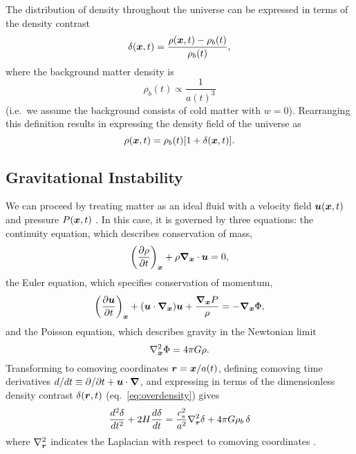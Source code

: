 The distribution of density throughout the universe can be expressed
in terms of the density contrast
\begin{equation}
  \label{eq:overdensity}
  \delta(\boldsymbol{x}, t) = \frac{\rho(\boldsymbol{x}, t) - \rho_b(t)}{\rho_b(t)},
\end{equation}
where the background matter density is
\begin{equation}
  \rho_b(t) \propto \frac{1}{a(t)^3}
\end{equation}
(i.e.~we assume the background consists of cold matter with $w=0$).
Rearranging this definition results in expressing the density field of the
universe as
\begin{equation}
  \rho(\boldsymbol{x}, t) = \rho_b(t)[1 + \delta(\boldsymbol{x}, t)].
\end{equation}

\subsection{Gravitational Instability}
We can proceed by treating matter as an ideal fluid with a
velocity field $\boldsymbol{u}(\boldsymbol{x}, t)$ and pressure $P(\boldsymbol{x}, t)$
\citep{longair2008galaxy}.
In this case, it is governed by three equations: the
continuity equation, which describes conservation of mass,
\begin{equation}
  \label{eq:continuity}
  \left(\frac{\partial\rho}{\partial t}\right)_{\boldsymbol{x}}
  + \rho\boldsymbol{\nabla}_{\boldsymbol{x}}\cdot\boldsymbol{u} = 0,
\end{equation}
the Euler equation, which specifies conservation of momentum,
\begin{equation}
  \label{eq:euler}
  \left(\frac{\partial\boldsymbol{u}}{\partial t}\right)_{\boldsymbol{x}}
  + (\boldsymbol{u}\cdot\boldsymbol{\nabla}_{\boldsymbol{x}})\boldsymbol{u}
  + \frac{\boldsymbol{\nabla}_{\boldsymbol{x}}P}{\rho}
  = -\boldsymbol{\nabla}_{\boldsymbol{x}}\Phi,
\end{equation}
and the Poisson equation, which describes gravity in the Newtonian limit
\begin{equation}
  \label{eq:poisson}
  \nabla_{\boldsymbol{x}}^2\Phi = 4\pi G\rho.
\end{equation}
Transforming to comoving coordinates $\boldsymbol{r} = \boldsymbol{x}/a(t)$,
defining comoving time derivatives
$d/dt \equiv \partial/\partial t + \boldsymbol{u}\cdot\boldsymbol{\nabla}$,
and expressing in terms of the dimensionless density contrast
$\delta(\boldsymbol{r}, t)$ (eq.~\ref{eq:overdensity}) gives
\begin{equation}
  \label{eq:delta_evolution}
  \frac{d^2\delta}{d t^2} + 2 H \frac{d\delta}{d t}
  = \frac{c_s^2}{a^2}\nabla_{\boldsymbol{r}}^2\delta + 4\pi G \rho_b\,\delta
\end{equation}
where $\nabla^2_{\boldsymbol{r}}$ indicates the Laplacian with respect to comoving
coordinates \citep[for derivation see section 11.2 of][]{longair2008galaxy}.

